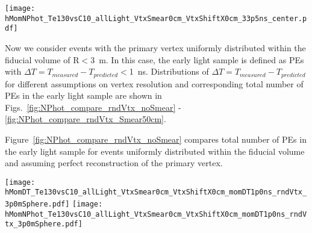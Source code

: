 \begin{figure*}[ht]
  \centering
  \texttt{[image: hMomNPhot\_Te130vsC10\_allLight\_VtxSmear0cm\_VtxShiftX0cm\_33p5ns\_center.pdf]}
  \caption{Total number of PEs in the early light sample. Comparison between $^{130}$Te 0{\nbb} decay 
    (solid red line) and $^{10}$C events (dashed greem line). Events are simulated at the center of the 
    detector. Perfect vertex reconstruction - true vertex position is used. Time cut of 
    33.5~ns on the photon arrival time is applied. Histograms are normalized to 1000 events.}
\label{fig:NPhot_compare_central}
\end{figure*}

Now we consider events with the primary vertex uniformly distributed within the fiducial volume of
R$<$3~m. In this case, the early light sample is defined as PEs with $\Delta T=T_{measured} -
T_{predicted}<$1~ns. Distributions of $\Delta T=T_{measured} - T_{predicted}$ for 
different assumptions on vertex resolution and corresponding total number of PEs in the early light
sample are shown in Figs.~\ref{fig:NPhot_compare_rndVtx_noSmear} - \ref{fig:NPhot_compare_rndVtx_Smear50cm}.

Figure~\ref{fig:NPhot_compare_rndVtx_noSmear} compares total number of PEs in the early light sample for 
events uniformly distributed within the fiducial volume and assuming perfect reconstruction of the primary 
vertex.

\begin{figure*}[ht]
  \centering
  \texttt{[image: hMomDT\_Te130vsC10\_allLight\_VtxSmear0cm\_VtxShiftX0cm\_momDT1p0ns\_rndVtx\_3p0mSphere.pdf]}
  \texttt{[image: hMomNPhot\_Te130vsC10\_allLight\_VtxSmear0cm\_VtxShiftX0cm\_momDT1p0ns\_rndVtx\_3p0mSphere.pdf]}
  \caption{(Left) Difference between measured PE arrival time and arrival time prediction based on 
	vertex location (T$^{predicted} = |r_{hit} - r_{vtx}|/v_{phot}$, where $v_phot = c/1.53$).
        $\vbb$-decay (black solid line) and $\Cten$ events (magenta dashed line) are compared. 
	Vertical line at 1~ns indicates cut for early light selection. 
        (Right) Total number of PEs in the early light sample. 
        $^{10}$C events with energy deposition in the $\pm$10\% energy range around Q-value are
	selected. Verticies are uniformly distributed within the fiducial volume, $R<3$~m.
        {\bf Perfect vertex reconstruction - true vertex position is used.}}
\label{fig:NPhot_compare_rndVtx_noSmear}
\end{figure*}


